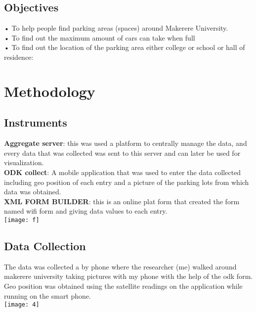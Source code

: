 \documentclass[18pt, a4paper]{article}
\begin{document}
				\subsection{Objectives}




•	To help people find parking areas (spaces) around Makerere University.\\
•	To find out the maximum amount of cars can take when full\\ 
•	To find out the location of the parking area either college or school or hall of residence:\\


				\section{Methodology}


                                              \subsection{Instruments}

\textbf{Aggregate server}: this was used a platform to centrally manage the data, and every data that was collected was sent to this server and can later be used for visualization.\\


\textbf{ODK collect}: A mobile application that was used to enter the data collected including geo position of each entry and a picture of the parking lots from which data was obtained.\\



\textbf{XML FORM BUILDER}: this is an online plat form that created the form named wifi form and giving data values to each entry.\\

\texttt{[image: f]}

			
			\subsection{Data Collection}

     
         The data was collected  a by phone where the researcher (me) walked around makerere university taking pictures with my phone with the help of the odk form.\\

	Geo position was obtained using the satellite readings on the application while running on the smart phone.\\
   \texttt{[image: 4]}
\end{document}
